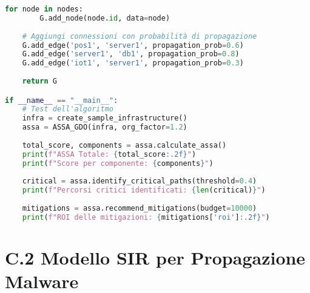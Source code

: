 \begin{lstlisting}[language=Python, caption=Implementazione dell'algoritmo ASSA-GDO]
    for node in nodes:
        G.add_node(node.id, data=node)
    
    # Aggiungi connessioni con probabilità di propagazione
    G.add_edge('pos1', 'server1', propagation_prob=0.6)
    G.add_edge('server1', 'db1', propagation_prob=0.8)
    G.add_edge('iot1', 'server1', propagation_prob=0.3)
    
    return G

if __name__ == "__main__":
    # Test dell'algoritmo
    infra = create_sample_infrastructure()
    assa = ASSA_GDO(infra, org_factor=1.2)
    
    total_score, components = assa.calculate_assa()
    print(f"ASSA Totale: {total_score:.2f}")
    print(f"Score per componente: {components}")
    
    critical = assa.identify_critical_paths(threshold=0.4)
    print(f"Percorsi critici identificati: {len(critical)}")
    
    mitigations = assa.recommend_mitigations(budget=10000)
    print(f"ROI delle mitigazioni: {mitigations['roi']:.2f}")
\end{lstlisting}

\section{C.2 Modello SIR per Propagazione Malware}

